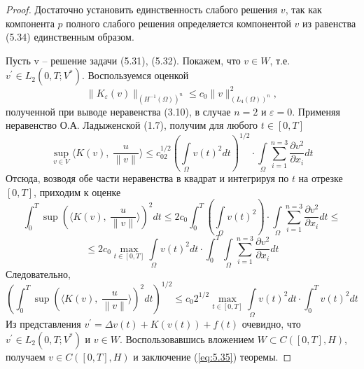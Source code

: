 \begin{proof}
    Достаточно установить единственность слабого решения $v$, так как компонента $p$ полного слабого решения определяется компонентой $v$
    из равенства (5.34) единственным образом.

    Пусть v -- решение задачи (5.31), (5.32). Покажем, что $v \in W$, т.е. $v^\prime \in L_2(0, T; V^\ast)$.
    Воспользуемся оценкой
    $$\| K_\varepsilon (v) \|_{(H^{-1}(\Omega))^n} \le c_0 \| v \|^2_{(L_4(\Omega))^n},$$
    полученной при выводе неравенства (3.10), в случае $n = 2$ и $\varepsilon = 0$. Применяя неравенство О.А. Ладыженской (1.7), получим для любого $t \in [0, T]$
    $$\sup\limits_{v\in V}\langle K(v), \ \frac{u}{\| v\|}
    \rangle\le c_02^{1/2}(\int\limits_\Omega v(t)^2dt)^{1/2}\cdot\int\limits_\Omega\sum_{i=1}^{n=3}\frac{\partial v^2}{\partial x_i}dt$$
    Отсюда, возводя обе части неравенства в квадрат и интегрируя по $t$ на отрезке $[0, T]$, приходим к оценке
    $$\int_0^T \sup(\langle K(v), \ \frac{u}{\| v\|}\rangle)^2dt \le 2c_0\int_0^T(\int\limits_\Omega v(t)^2)
    \cdot\int\limits_\Omega\sum_{i=1}^{n=3}\frac{\partial v^2}{\partial x_i}dt\le$$
    $$\le 2c_0 \max\limits_{t\in[0, T]}\int\limits_\Omega v(t)^2dt\cdot\int_0^T\int\limits_\Omega\sum_{i=1}^{n=3}\frac{\partial v^2}{\partial x_i}dt$$
    Следовательно,
    $$(\int_0^T \sup(\langle K(v), \ \frac{u}{\| v\|}\rangle)^2dt)^{1/2}\le c_0 2^{1/2}\max\limits_{t\in[0, T]}
    \int\limits_\Omega v(t)^2dt\cdot\int_0^T v(t)^2dt$$
    Из представления $v^\prime = \Delta v(t) + K(v(t)) + f(t)$ очевидно, что $v^\prime \in L_2(0, T; V^\ast)$ и $v \in W$.
    Воспользовавшись вложением $W \subset C([0, T], H)$, получаем $v \in C([0, T], H)$ и заключение (\ref{eq:5.35}) теоремы.


\end{proof}
